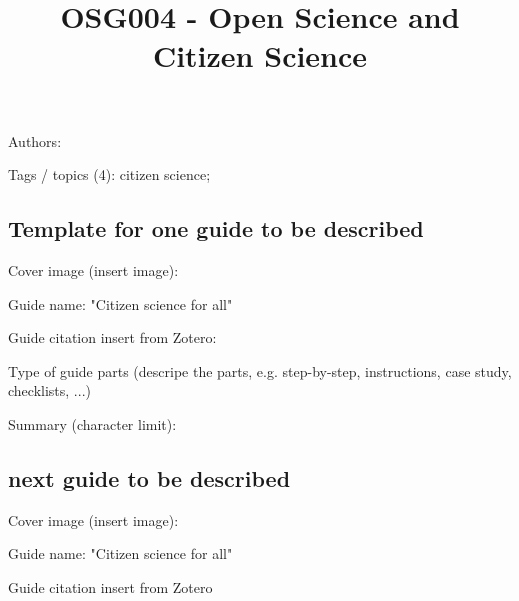 \documentclass{article}
\begin{document}
\title{OSG004 - Open Science and Citizen Science}

\maketitle


Authors: 


Tags / topics (4): citizen science; 


\subsection{Template for one guide to be described}\label{H7151279}



Cover image (insert image):


Guide name: "Citizen science for all"


Guide citation insert from Zotero: \autocite{noauthor_citizen_2016}\autocite{pocock_choosing_2014}


Type of guide parts (descripe the parts, e.g. step-by-step, instructions, case study, checklists, ...)


Summary (character limit): 


\subsection{next guide to be described}\label{H7212092}



Cover image (insert image):


Guide name: "Citizen science for all"


Guide citation insert from Zotero \autocite{pocock_choosing_2014}  


\printbibliography[title={Literaturverzeichnis}]
\end{document}
